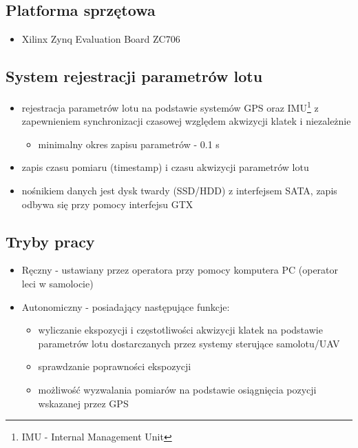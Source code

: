 \documentclass[a4paper,11pt,oneside]{article}  %
\begin{document}
\subsection{Platforma sprzętowa}
\begin{itemize}
\item Xilinx Zynq Evaluation Board ZC706 \cite{ZC706}
\end{itemize}

\subsection{System rejestracji parametrów lotu}

\begin{itemize}
\item rejestracja parametrów lotu na podstawie systemów GPS oraz IMU\footnote{IMU - Internal Management Unit} z zapewnieniem synchronizacji czasowej względem akwizycji klatek i niezależnie 
	\begin{itemize}
	\item minimalny okres zapisu parametrów - 0.1 s
	\end{itemize}
\item zapis czasu pomiaru (timestamp) i czasu akwizycji parametrów lotu
\item nośnikiem danych jest dysk twardy 
(SSD/HDD) z interfejsem SATA, zapis odbywa się przy pomocy interfejsu GTX
\end{itemize}



\subsection{Tryby pracy}

\begin{itemize}
\item Ręczny - ustawiany przez operatora przy pomocy komputera PC (operator leci w samolocie)
\item Autonomiczny - posiadający następujące funkcje: 
	\begin{itemize}
		\item wyliczanie ekspozycji i częstotliwości akwizycji klatek na podstawie parametrów lotu dostarczanych przez systemy sterujące samolotu/UAV
		\item sprawdzanie poprawności ekspozycji
		\item możliwość wyzwalania pomiarów na podstawie osiągnięcia pozycji wskazanej przez GPS
	\end{itemize}
	
\end{itemize}
\end{document}

